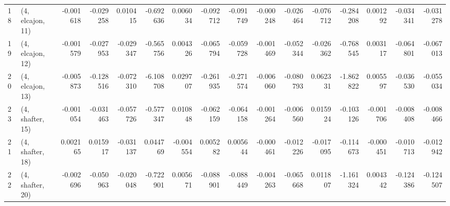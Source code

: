 \begin{tabular}{llrrrrrrrrrrrrrr}
18 &  (4, elcajon, 11) &  -0.001618 & -0.029258 &  0.010415 &  -0.692636 &  0.006034 &  -0.092712 & -0.091749 & -0.000248 & -0.026464 & -0.076712 &  -0.284208 &  0.001292 & -0.034341 & -0.031278 \\
19 &  (4, elcajon, 12) &  -0.001579 & -0.027953 & -0.029347 &  -0.565756 &  0.004326 &  -0.065794 & -0.059728 & -0.001469 & -0.052344 & -0.026362 &  -0.768545 &  0.003117 & -0.064801 & -0.067013 \\
20 &  (4, elcajon, 13) &  -0.005873 & -0.128516 & -0.072310 &  -6.108708 &  0.029707 &  -0.261935 & -0.271574 & -0.006060 & -0.080793 &  0.062331 &  -1.862822 &  0.005597 & -0.036530 & -0.055034 \\
23 &  (4, shafter, 15) &  -0.001054 & -0.031463 & -0.057726 &  -0.577347 &  0.010848 &  -0.062159 & -0.064158 & -0.001264 & -0.006560 &  0.015924 &  -0.103126 & -0.001706 & -0.008408 & -0.008466 \\
21 &  (4, shafter, 18) &   0.002165 &  0.015917 & -0.031137 &   0.044769 & -0.004554 &   0.005282 &  0.005644 & -0.000461 & -0.012226 & -0.017095 &  -0.114673 & -0.000451 & -0.010713 & -0.012942 \\
22 &  (4, shafter, 20) &  -0.002696 & -0.050963 & -0.020048 &  -0.722901 &  0.005671 &  -0.088901 & -0.088449 & -0.004263 & -0.065668 &  0.011807 &  -1.161324 &  0.004342 & -0.124386 & -0.124507 \\
\bottomrule
\end{tabular}
